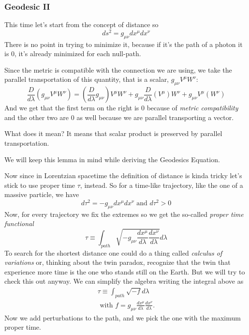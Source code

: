 \subsubsection{Geodesic II}

This time let's start from the concept of distance so
\[
ds^{2} = g_{\mu \nu } dx^{\mu }dx^{\nu }
\]
There is no point in trying to minimize it, because if it's the path of a photon it is 0, it's already minimized for each null-path.\par
Since the metric is compatible with the connection we are using, we take the parallel transportation of this quantity, that is a scalar, $g_{\mu \nu }V^{\mu }W^{\nu }$:
\begin{equation}
\frac{D}{d\lambda } \left( g_{\mu \nu }V^{\mu }W^{\nu }	 \right) = \left( \frac{D}{d\lambda } g_{\mu \nu } \right)V^{\mu }W^{\nu } + g_{\mu \nu } \frac{D}{d\lambda }\left( V^{\mu }\right)W^{\nu }+ g_{\mu \nu} V^{\mu }\left( W^{\nu } \right)
\end{equation}
And we get that the first term on the right is 0 because of \emph{metric compatibility} and the other two are 0 as well because we are parallel transporting a vector.\par
What does it mean? It means that scalar product is preserved by parallel transportation.\par
We will keep this lemma in mind while deriving the Geodesics Equation.

Now since in Lorentzian spacetime the definition of distance is kinda tricky let's stick to use proper time $\tau $, instead. So for a time-like trajectory, like the one of a massive particle, we have
\[
d\tau ^{2}= -g_{\mu \nu }dx^{\mu }dx^{\nu } \text{ and } d\tau ^{2}> 0
\]
Now, for every trajectory we fix the extremes so we get the so-called \emph{proper time functional}
\[
\tau \equiv \int_{path}^{}\sqrt{-g_{\mu \nu } \frac{d x^{\mu }}{d \lambda } \frac{d x^{\nu }}{d \lambda }} d\lambda 	
\]
To search for the shortest distance one could do a thing called \emph{calculus of variations} or, thinking about the twin paradox, recognize that the twin that experience more time is the one who stands still on the Earth. But we will try to check this out anyway.  We can simplify the algebra writing the integral above as
\begin{gather*}
	\tau  \equiv \int_{path}^{}{\sqrt{-f} d\lambda } \\
	\text{ with } f = g_{\mu \nu } \frac{d x^{\mu }}{d \lambda } \frac{d x^{\nu }}{d \lambda }.
\end{gather*}
Now we add perturbations to the path, and we pick the one with the maximum proper time.

